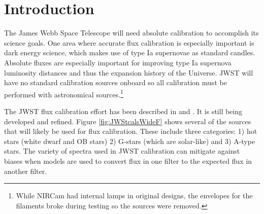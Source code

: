 \documentclass{aastex6}
\begin{document}




\section{Introduction}

The James Webb Space Telescope \citep[JWST; e.g.][]{gardner2006SSRv} will need absolute calibration to accomplish its science goals.
One area where accurate flux calibration is especially important is dark energy science, which makes use of type Ia supernovae as standard candles.
Absolute fluxes are especially important for improving type Ia supernova luminosity distances and thus the expansion history of the Universe.
JWST will have no standard calibration sources onboard so all calibration must be performed with astronomical sources.\footnote{While NIRCam had internal lamps in original designs, the envelopes for the filaments broke during testing so the sources were removed.}

The JWST flux calibration effort has been described in \citet{gordon2009fluxplan1} and \citet{gordon2011fluxplan2}.
It is still being developed and refined.
Figure \ref{fig:JWStcalsWideF} shows several of the sources that will likely be used for flux calibration.
These include three categories: 1) hot stars (white dwarf and OB stars) 2) G-stars (which are solar-like) and 3) A-type stars.
The variety of spectra used in JWST calibration can mitigate against biases when models are used to convert flux in one filter to the expected flux in another filter.
\end{document}
